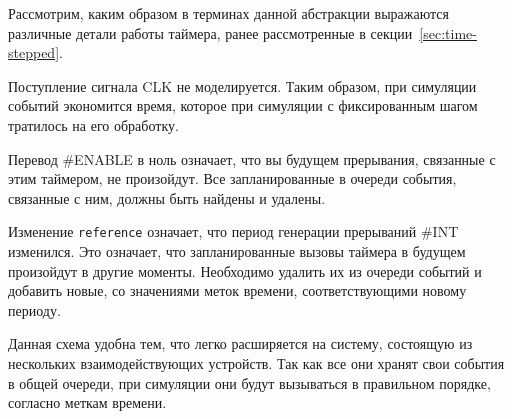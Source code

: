 Рассмотрим, каким образом в терминах данной абстракции выражаются различные детали работы таймера, ранее рассмотренные в секции \ref{sec:time-stepped}.
\begin{itemize*}
    \item Поступление сигнала CLK не моделируется. Таким образом, при симуляции событий экономится время, которое при симуляции с фиксированным шагом тратилось на его обработку.
    \item Перевод \#ENABLE в ноль означает, что вы будущем прерывания, связанные с этим таймером, не произойдут. Все запланированные в очереди события, связанные с ним, должны быть найдены и удалены.
    \item Изменение \texttt{reference} означает, что период генерации прерываний \#INT изменился. Это означает, что  запланированные вызовы таймера в будущем произойдут в другие моменты. Необходимо удалить их из очереди событий и добавить новые, со значениями меток времени, соответствующими новому периоду.
\end{itemize*}

Данная схема удобна тем, что легко расширяется на систему, состоящую из нескольких взаимодействующих устройств. Так как все они хранят свои события в общей очереди, при симуляции они будут вызываться в правильном порядке, согласно меткам времени.

